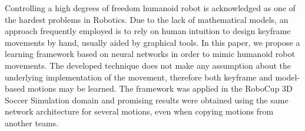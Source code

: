 Controlling a high degrees of freedom humanoid robot is acknowledged as one of the hardest problems in Robotics. Due to the lack of mathematical models, an approach frequently employed is to rely on human intuition to design keyframe movements by hand, usually aided by graphical tools. In this paper, we propose a learning framework based on neural networks in order to mimic humanoid robot movements. The developed technique does not make any assumption about the underlying implementation of the movement, therefore both keyframe and model-based motions may be learned. The framework was applied in the RoboCup 3D Soccer Simulation domain and promising results were obtained using the same network architecture for several motions, even when copying motions from another teams.